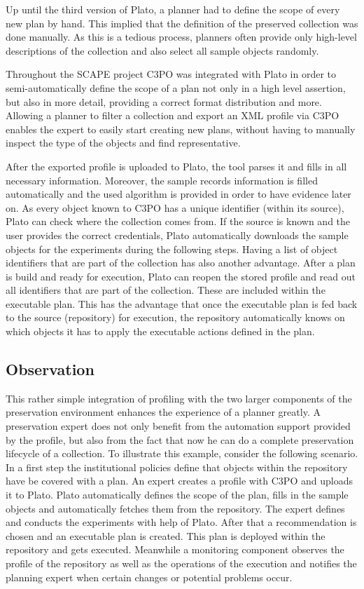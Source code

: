 Up until the third version of Plato, a planner had to define the scope of every new plan by hand. This implied that the definition of the preserved collection was done manually. As this is a tedious process, planners often provide only high-level descriptions of the collection and also select all sample objects randomly.

Throughout the SCAPE project C3PO was integrated with Plato in order to semi-automatically define the scope of a plan not only in a high level assertion, but also in more detail, providing a correct format distribution and more.
Allowing a planner to filter a collection and export an XML profile via C3PO enables the expert to easily start creating new plans, without having to manually inspect the type of the objects and find representative.

After the exported profile is uploaded to Plato, the tool parses it and fills in all necessary information. Moreover, the sample records information is filled automatically and the used algorithm is provided in order to have evidence later on.
As every object known to C3PO has a unique identifier (within its source), Plato can check where the collection comes from. If the source is known and the user provides the correct credentials, Plato automatically downloads the sample objects for the experiments during the following steps.
Having a list of object identifiers that are part of the collection has also another advantage. After a plan is build and ready for execution, Plato can reopen the stored profile and read out all identifiers that are part of the collection. These are included within the executable plan. This has the advantage that once the executable plan is fed back to the source (repository) for execution, the repository automatically knows on which objects it has to apply the executable actions defined in the plan.

\subsection{Observation}
This rather simple integration of profiling with the two larger components of the preservation environment  enhances the experience of a planner greatly. A preservation expert does not only benefit from the automation support provided by the profile, but also from the fact that now he can do a complete preservation lifecycle of a collection. To illustrate this example, consider the following scenario. In a first step the institutional policies define that objects within the repository have be covered with a plan. An expert creates a profile with C3PO and uploads it to Plato. Plato automatically defines the scope of the plan, fills in the sample objects and automatically fetches them from the repository. The expert defines and conducts the experiments with help of Plato. After that a recommendation is chosen and an executable plan is created. This plan is deployed within the repository and gets executed. Meanwhile a monitoring component observes the profile of the repository as well as the operations of the execution and notifies the planning expert when certain changes or potential problems occur.
